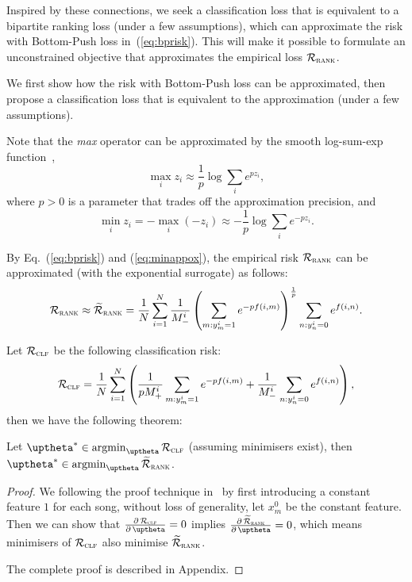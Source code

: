 Inspired by these connections, we seek a classification loss that is equivalent to a bipartite ranking loss (under a few assumptions),
which can approximate the risk with Bottom-Push loss in~(\ref{eq:bprisk}).
This will make it possible to formulate an unconstrained objective that approximates the empirical loss $\mathcal{R}_\textsc{rank}$.

We first show how the risk with Bottom-Push loss can be approximated,
then propose a classification loss that is equivalent to the approximation (under a few assumptions).

Note that the \emph{max} operator can be approximated by the smooth log-sum-exp function~\cite[p. 72]{boyd2004convex},
$$
\max_i z_i \approx \frac{1}{p} \log \sum_i e^{p z_i},
$$
where $p > 0$ is a parameter that trades off the approximation precision, and
\begin{equation}
\label{eq:minappox}
\min_i z_i = -\max_i (-z_i) \approx -\frac{1}{p} \log \sum_i e^{-p z_i}.
\end{equation}

By Eq.~(\ref{eq:bprisk}) and (\ref{eq:minappox}), the empirical risk $\mathcal{R}_\textsc{rank}$ can be approximated
(with the exponential surrogate) as follows:
\begin{equation*}
\begin{aligned}
\mathcal{R}_\textsc{rank}
\approx \widetilde{\mathcal{R}}_\textsc{rank}
= \frac{1}{N} \sum_{i=1}^N \frac{1}{M_-^i} \left( \sum_{m: y_m^i = 1} e^{-p f(i, m)} \right)^\frac{1}{p} \sum_{n: y_n^i = 0} e^{f(i, n)}.
\end{aligned}
\end{equation*}


Let $\mathcal{R}_\textsc{clf}$ be the following classification risk:
\begin{equation*}
\mathcal{R}_\textsc{clf}
= \frac{1}{N} \sum_{i=1}^N \left(
  \frac{1}{p M_+^i} \sum_{m: y_m^i = 1} e^{-p f(i, m)}
  + \frac{1}{M_-^i} \sum_{n: y_n^i = 0} e^{f(i, n)} \right),
\end{equation*}
then we have the following theorem:
\begin{theorem}
\label{th:rank2clf}
Let $\uptheta^* \in \argmin_{\uptheta} \RCal_\textsc{clf}$ (assuming minimisers exist),
then $\uptheta^* \in \argmin_{\uptheta} \widetilde\RCal_\textsc{rank}$.
\end{theorem}

\begin{proof}
We following the proof technique in~\cite{ertekin2011equivalence}
by first introducing a constant feature $1$ for each song,
without loss of generality, let $x_m^0$ be the constant feature.
Then we can show that
$\frac{\partial \, \RCal_\textsc{clf}} {\partial \, \uptheta} = 0$ implies
$\frac{\partial \, \widetilde\RCal_\textsc{rank}} {\partial \, \uptheta} = 0$,
which means minimisers of $\mathcal{R}_\textsc{clf}$ also minimise $\widetilde{\mathcal{R}}_\textsc{rank}$.

The complete proof is described in Appendix.
\end{proof}

